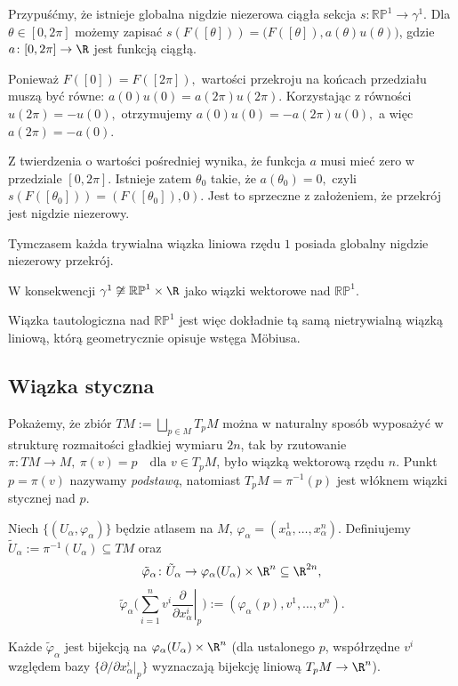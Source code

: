 \begin{przyklad}
Przypuśćmy, że istnieje globalna
nigdzie niezerowa ciągła sekcja
$
s\colon\mathbb{RP}^1\longrightarrow\gamma^1.
$
Dla $\theta\in[0,2\pi]$ możemy zapisać $s(F([\theta])) = \bigl(F([\theta]),a(\theta)u(\theta)\bigr)$,
gdzie $a\colon[0,2\pi]\to\R$
jest funkcją ciągłą.

Ponieważ
$
F([0])=F([2\pi]),
$
wartości przekroju na końcach przedziału
muszą być równe:
$
a(0)u(0)=a(2\pi)u(2\pi).
$
Korzystając z równości
$
u(2\pi)=-u(0),
$
otrzymujemy
$
a(0)u(0)=-a(2\pi)u(0),
$
a więc
$
a(2\pi)=-a(0).
$

Z twierdzenia o wartości pośredniej
wynika, że funkcja $a$ musi mieć zero
w przedziale $[0,2\pi]$.
Istnieje zatem $\theta_0$ takie, że
$
a(\theta_0)=0,
$
czyli
$
s(F([\theta_0]))
=
(F([\theta_0]),0).
$
Jest to sprzeczne z założeniem,
że przekrój jest nigdzie niezerowy.

Tymczasem każda trywialna wiązka
liniowa rzędu $1$ posiada globalny
nigdzie niezerowy przekrój.

W konsekwencji
$
\gamma^1\not\cong\mathbb{RP}^1\times\R
$
jako wiązki wektorowe nad $\mathbb{RP}^1$.

Wiązka tautologiczna nad $\mathbb{RP}^1$
jest więc dokładnie tą samą
nietrywialną wiązką liniową,
którą geometrycznie opisuje wstęga Möbiusa.
\end{przyklad}

\subsection*{Wiązka styczna}

Pokażemy, że zbiór $TM:=\bigsqcup_{p\in M}T_pM$
można w naturalny sposób wyposażyć w strukturę rozmaitości gładkiej
wymiaru $2n$, tak by rzutowanie $\pi\colon TM\to M, \ \pi(v)=p \quad\text{dla }v\in T_pM$,
było wiązką wektorową rzędu $n$.
Punkt $p=\pi(v)$ nazywamy \emph{podstawą}, natomiast
$T_pM=\pi^{-1}(p)$ jest włóknem wiązki stycznej nad $p$.

Niech $\{(U_\alpha,\varphi_\alpha)\}$ będzie atlasem na $M$,
$\varphi_\alpha=(x^1_\alpha,\dots,x^n_\alpha)$.
Definiujemy $\tilde U_\alpha:=\pi^{-1}(U_\alpha)\subseteq TM$
oraz
\[
\tilde\varphi_\alpha\colon
\tilde U_\alpha\to
\varphi_\alpha(U_\alpha)\times\R^n\subseteq\R^{2n},
\]
\[
\tilde\varphi_\alpha\Big(
\sum_{i=1}^n v^i
\left.\frac{\partial}{\partial x^i_\alpha}\right|_p
\Big)
:=
(\varphi_\alpha(p),v^1,\dots,v^n).
\]

Każde $\tilde\varphi_\alpha$ jest bijekcją na $\varphi_\alpha(U_\alpha)\times\R^n$
(dla ustalonego $p$, współrzędne $v^i$ względem bazy $\{\partial/\partial x^i_\alpha|_p\}$
wyznaczają bijekcję liniową $T_pM\to\R^n$).

